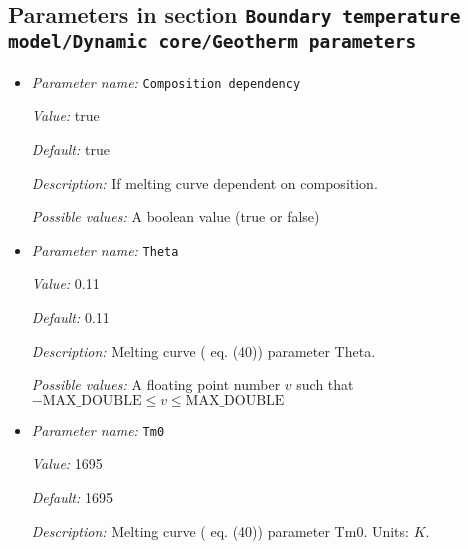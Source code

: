 \subsection{Parameters in section \tt Boundary temperature model/Dynamic core/Geotherm parameters}
\label{parameters:Boundary_20temperature_20model/Dynamic_20core/Geotherm_20parameters}

\begin{itemize}
\item {\it Parameter name:} {\tt Composition dependency}
\label{parameters:Boundary temperature model/Dynamic core/Geotherm parameters/Composition dependency}
\label{parameters:Boundary_20temperature_20model/Dynamic_20core/Geotherm_20parameters/Composition_20dependency}


{\it Value:} true


{\it Default:} true


{\it Description:} If melting curve dependent on composition.


{\it Possible values:} A boolean value (true or false)
\item {\it Parameter name:} {\tt Theta}
\label{parameters:Boundary temperature model/Dynamic core/Geotherm parameters/Theta}
\label{parameters:Boundary_20temperature_20model/Dynamic_20core/Geotherm_20parameters/Theta}


{\it Value:} 0.11


{\it Default:} 0.11


{\it Description:} Melting curve (\cite{NPB+04} eq. (40)) parameter Theta.


{\it Possible values:} A floating point number $v$ such that $-\text{MAX\_DOUBLE} \leq v \leq \text{MAX\_DOUBLE}$
\item {\it Parameter name:} {\tt Tm0}
\label{parameters:Boundary temperature model/Dynamic core/Geotherm parameters/Tm0}
\label{parameters:Boundary_20temperature_20model/Dynamic_20core/Geotherm_20parameters/Tm0}


{\it Value:} 1695


{\it Default:} 1695


{\it Description:} Melting curve (\cite{NPB+04} eq. (40)) parameter Tm0. Units: $K$.



\end{itemize}
